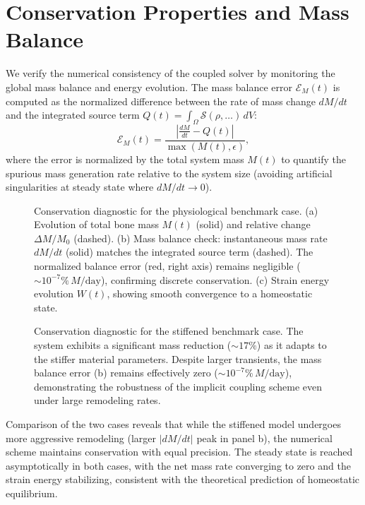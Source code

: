\section{Conservation Properties and Mass Balance}
\label{sec:conservation-diagnostic}

We verify the numerical consistency of the coupled solver by monitoring the global mass balance and energy evolution.
The mass balance error $\mathcal{E}_M(t)$ is computed as the normalized difference between the rate of mass change $dM/dt$ and the integrated source term $Q(t) = \int_\Omega \mathcal{S}(\rho, \dots)\,dV$:
\begin{equation}
    \mathcal{E}_M(t) = \frac{\left| \frac{dM}{dt} - Q(t) \right|}{\max(M(t), \epsilon)},
\end{equation}
where the error is normalized by the total system mass $M(t)$ to quantify the spurious mass generation rate relative to the system size (avoiding artificial singularities at steady state where $dM/dt \to 0$).

\begin{figure}[htbp]
    \centering
    \caption{Conservation diagnostic for the physiological benchmark case.
    (a) Evolution of total bone mass $M(t)$ (solid) and relative change $\Delta M/M_0$ (dashed).
    (b) Mass balance check: instantaneous mass rate $dM/dt$ (solid) matches the integrated source term (dashed). The normalized balance error (red, right axis) remains negligible ($\sim 10^{-7}\%\,M/\text{day}$), confirming discrete conservation.
    (c) Strain energy evolution $W(t)$, showing smooth convergence to a homeostatic state.}
    \label{fig:conservation-physio}
\end{figure}

\begin{figure}[htbp]
    \centering
    \caption{Conservation diagnostic for the stiffened benchmark case.
    The system exhibits a significant mass reduction ($\sim 17\%$) as it adapts to the stiffer material parameters.
    Despite larger transients, the mass balance error (b) remains effectively zero ($\sim 10^{-7}\%\,M/\text{day}$), demonstrating the robustness of the implicit coupling scheme even under large remodeling rates.}
    \label{fig:conservation-stiff}
\end{figure}

Comparison of the two cases reveals that while the stiffened model undergoes more aggressive remodeling (larger $|dM/dt|$ peak in panel b), the numerical scheme maintains conservation with equal precision. The steady state is reached asymptotically in both cases, with the net mass rate converging to zero and the strain energy stabilizing, consistent with the theoretical prediction of homeostatic equilibrium.

